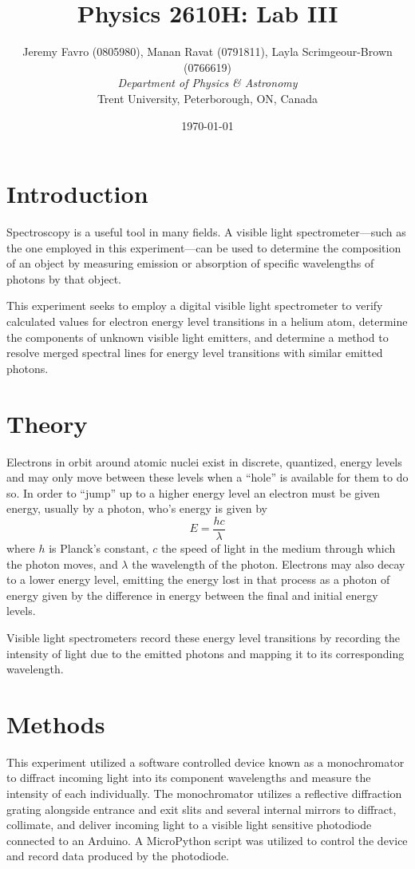 \documentclass[10pt, twocolumn]{article}
\title{Physics 2610H: Lab III}
\author{Jeremy Favro (0805980),
Manan Ravat (0791811),
Layla Scrimgeour-Brown (0766619)
 \\\emph{Department of Physics \& Astronomy}\\ Trent University, Peterborough, ON, Canada}
\date{\today}
\theoremstyle{definition}
\begin{document}
\maketitle
\begin{abstract}
\end{abstract}
\section{Introduction}
Spectroscopy is a useful tool in many fields. A visible light spectrometer---such as the one employed in this experiment---can be used to determine the composition of an object by measuring emission or absorption of
specific wavelengths of photons by that object.

This experiment seeks to employ a digital visible light spectrometer to verify calculated values for electron energy level transitions in a helium atom,
determine the components of unknown visible light emitters, and determine a method to resolve merged spectral lines for energy
level transitions with similar emitted photons.
\section{Theory}
Electrons in orbit around atomic nuclei exist in discrete, quantized, energy levels and may only move between these levels when a ``hole''
is available for them to do so. In order to ``jump'' up to a higher energy level an electron must be given energy, usually by a photon, who's energy is given by
$$E=\frac{hc}{\lambda}$$ where $h$ is Planck's constant\autocite{codata}, $c$ the speed of light in the medium through which the photon moves, and $\lambda$ the
wavelength of the photon. Electrons may also decay to a lower energy level, emitting the energy lost in that process as a photon of energy given by the difference in energy
between the final and initial energy levels.

Visible light spectrometers record these energy level transitions by recording the intensity of light due to the emitted photons
and mapping it to its corresponding wavelength.
\vfill\null
\section{Methods}
This experiment utilized a software controlled device known as a monochromator to diffract incoming light into its component wavelengths
and measure the intensity of each individually. The monochromator utilizes a reflective diffraction grating alongside entrance and exit slits
and several internal mirrors to diffract, collimate, and deliver incoming light to a visible light sensitive photodiode connected to an Arduino.
A MicroPython script was utilized to control the device and record data produced by the photodiode.
\end{document}
